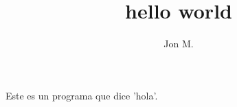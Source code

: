 \documentclass{article}
\title{hello world}
\author{Jon M.}
\begin{document}
\maketitle

\begin{flushleft}
Este es un programa que dice 'hola'.
\end{flushleft}
\end{document}
